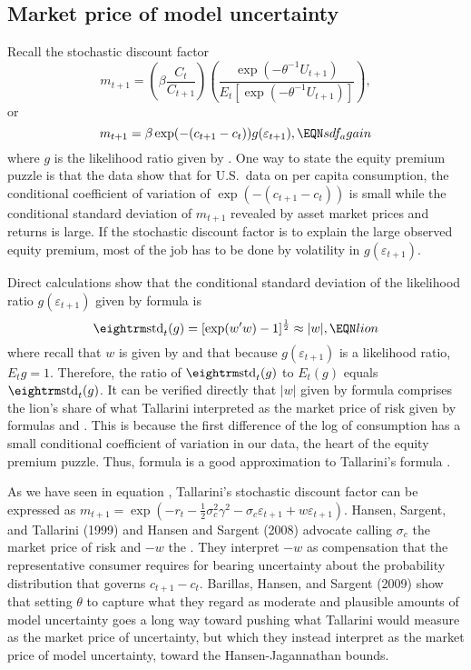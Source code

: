 \subsection{Market price of  model uncertainty}\label{sec:MPU}%
Recall the stochastic discount factor 
$$
m_{t+1}=\left(\beta{\frac{C_{t}}{C_{t+1}}}\right)\left({\frac{\exp \left( -\theta^{-1} U_{t+1}\right) }{E_{t}\left[
\exp \left( - \theta^{-1}
U_{t+1}\right) \right] }}\right) ,
$$
or
$$
m_{t+1}= \beta \exp( - (c_{t+1} - c_t) ) g(\varepsilon_{t+1}), \EQN sdf_again
$$
where $g$ is the likelihood ratio given  by .
One way to state the equity premium puzzle is that the data
show that for U.S.\ data on per capita consumption, the conditional coefficient of variation of $\exp( - (c_{t+1} - c_t) )$
is small while the conditional standard deviation of $m_{t+1}$ revealed by asset market prices and returns is large.
If the stochastic discount factor  is to explain the large observed equity premium, most of the
job has to be done by volatility in $g(\varepsilon_{t+1})$.


 Direct calculations show that   the conditional standard
deviation of the likelihood ratio  $g(\varepsilon_{t+1})$ given by formula  is
$$ {\rm std}_t(g) = [\exp(w' w)-1]^{1\over 2}
\approx | w|, \EQN lion
$$
where recall that $w$ is given by  and that because $g(\varepsilon_{t+1})$ is a likelihood ratio, $E_t g= 1$. Therefore, the ratio of ${\rm std}_t (g)$ to $E_t (g)$ equals ${\rm std}_t (g)$.
    It can be verified directly that
$|w|$ given by formula  comprises the lion's share
of what Tallarini interpreted as the market price of risk given by
formulas  and . This is because the first
difference of the log of consumption has a small conditional
coefficient of variation in our data,  the heart of the equity premium puzzle. Thus, formula  is a
good approximation to Tallarini's formula .

As we have seen in equation ,  Tallarini's stochastic discount factor can be expressed as
$m_{t+1}  = \exp( - r_t - {\frac{1}{2}} \sigma_c^2 \gamma^2 - \sigma_c \varepsilon_{t+1} + w \varepsilon_{t+1} )$.
 Hansen, Sargent, and Tallarini (1999) and Hansen and Sargent (2008)  advocate  calling $\sigma_c$ the market price of risk
 and
$-w$ the {\it {}}. They  interpret $-w$  as compensation that the representative consumer requires
for bearing  uncertainty about the probability distribution that governs $c_{t+1} - c_t$.  Barillas, Hansen, and Sargent (2009)
show that setting $\theta$ to capture what they regard as moderate and plausible  amounts of model uncertainty
goes a long way toward  pushing  what Tallarini would measure as the market price of uncertainty,
but which they instead interpret as the market price of model uncertainty, toward the Hansen-Jagannathan bounds.
%
%
%


